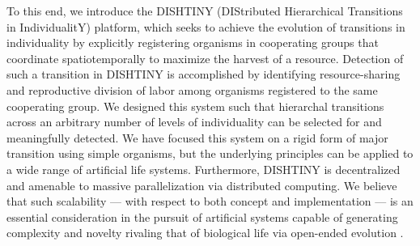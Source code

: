 To this end, we introduce the DISHTINY (DIStributed Hierarchical Transitions in IndividualitY) platform, which seeks to achieve the evolution of transitions in individuality by explicitly registering organisms in cooperating groups that coordinate spatiotemporally to maximize the harvest of a resource.
Detection of such a transition in DISHTINY is accomplished by identifying resource-sharing and reproductive division of labor among organisms registered to the same cooperating group.
We designed this system such that hierarchal transitions across an arbitrary number of levels of individuality can be selected for and meaningfully detected.
We have focused this system on a rigid form of major transition using simple organisms, but the underlying principles can be applied to a wide range of artificial life systems.
Furthermore, DISHTINY is decentralized and amenable to massive parallelization via distributed computing.
We believe that such scalability --- with respect to both concept and implementation --- is an essential consideration in the pursuit of artificial systems capable of generating complexity and novelty rivaling that of biological life via open-ended evolution \citep{ackley2011pursue, ackley2016indefinite}.
